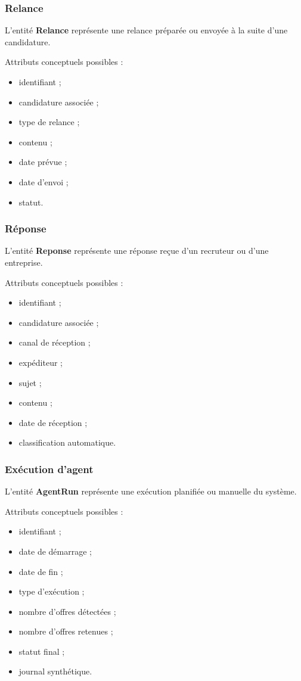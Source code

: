 \documentclass[11pt,a4paper]{article}
\begin{document}
\subsubsection{Relance}

L’entité \textbf{Relance} représente une relance préparée ou envoyée à la suite d’une candidature.

Attributs conceptuels possibles :
\begin{itemize}
    \item identifiant ;
    \item candidature associée ;
    \item type de relance ;
    \item contenu ;
    \item date prévue ;
    \item date d’envoi ;
    \item statut.
\end{itemize}

\subsubsection{Réponse}

L’entité \textbf{Reponse} représente une réponse reçue d’un recruteur ou d’une entreprise.

Attributs conceptuels possibles :
\begin{itemize}
    \item identifiant ;
    \item candidature associée ;
    \item canal de réception ;
    \item expéditeur ;
    \item sujet ;
    \item contenu ;
    \item date de réception ;
    \item classification automatique.
\end{itemize}

\subsubsection{Exécution d’agent}

L’entité \textbf{AgentRun} représente une exécution planifiée ou manuelle du système.

Attributs conceptuels possibles :
\begin{itemize}
    \item identifiant ;
    \item date de démarrage ;
    \item date de fin ;
    \item type d’exécution ;
    \item nombre d’offres détectées ;
    \item nombre d’offres retenues ;
    \item statut final ;
    \item journal synthétique.
\end{itemize}
\end{document}
